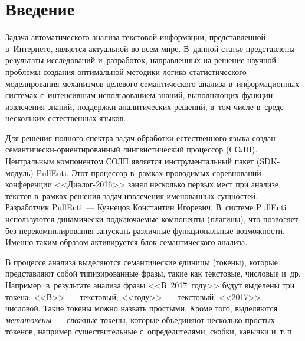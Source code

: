 
  
\vspace*{-1pt}



\thispagestyle{headings}

\begin{multicols}{2}

\label{st\stat}
     
     \section{Введение}
     
     \vspace*{-4pt}
     
     Задача автоматического анализа текстовой информации, 
представленной в~Интернете, является актуальной во всем мире. В~данной 
статье пред\-ставле\-ны результаты исследований и~разработок, на\-прав\-лен\-ных 
на решение научной проб\-ле\-мы со\-зда\-ния оптимальной методики  
ло\-ги\-ко-ста\-ти\-сти\-че\-ско\-го моделирования механизмов целевого 
семантического анализа в~информационных сис\-те\-мах с~интенсивным 
использованием знаний, выполняющих функции извлечения знаний, 
поддержки аналитических решений, в~том чис\-ле в~среде нескольких 
естественных языков. 

Для решения полного спектра задач обработки 
естественного языка создан се\-ман\-ти\-че\-ски-ори\-ен\-ти\-ро\-ван\-ный 
лингвистический процессор (СОЛП). Центральным компонентом СОЛП 
является инструментальный пакет (SDK-мо\-дуль) PullEnti. Этот процессор 
в~рамках проводимых соревнований конференции <<Диа\-лог-2016>> занял 
несколько первых мест при анализе текс\-тов в~рамках решения задач 
извлечения именованных сущностей. Разработчик PullEnti~--- Кузнецов 
Константин Игоревич. В~сис\-те\-ме PullEnti используются динамически 
подключаемые компоненты (плагины), что позволяет без 
перекомпилирования запускать различные функциональные возможности. 
Именно таким образом активируется блок семантического анализа. 
     
     В процессе анализа выделяются семантические единицы (токены), 
которые представляют собой типизированные фразы, такие как текс\-то\-вые, 
чис\-ло\-вые и~др. Например, в~результате анализа фразы <<В~2017~году>> 
будут выделены три токена: <<В>>~--- текс\-то\-вый; <<году>>~--- текстовый; 
<<2017>>~--- чис\-ло\-вой. Такие токены можно назвать прос\-ты\-ми. Кроме того, 
выделяются \textit{метатокены}~--- слож\-ные токены, которые объединяют 
несколько прос\-тых токенов, например существительные с~определителями, 
скобки, кавычки и~т.\,п.
     

\end{multicols}
